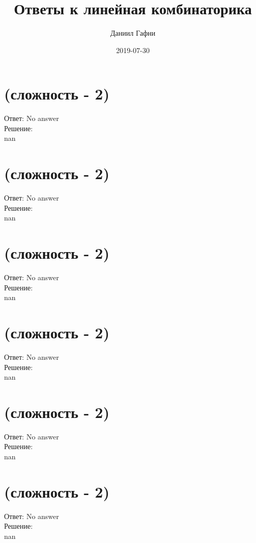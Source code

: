 \documentclass{article}%
\title{Ответы к линейная комбинаторика}%
\author{Даниил Гафни}%
\date{2019{-}07{-}30}%
\begin{document}
%
\normalsize%
\maketitle%
\section{(сложность {-} 2)}%
\label{sec:( {-} 2)}%
\hspace{3ex} Ответ: No answer \\%
%
\hspace*{3ex} Решение: \\%
nan

%
\section{(сложность {-} 2)}%
\label{sec:( {-} 2)}%
\hspace{3ex} Ответ: No answer \\%
%
\hspace*{3ex} Решение: \\%
nan

%
\section{(сложность {-} 2)}%
\label{sec:( {-} 2)}%
\hspace{3ex} Ответ: No answer \\%
%
\hspace*{3ex} Решение: \\%
nan

%
\section{(сложность {-} 2)}%
\label{sec:( {-} 2)}%
\hspace{3ex} Ответ: No answer \\%
%
\hspace*{3ex} Решение: \\%
nan

%
\section{(сложность {-} 2)}%
\label{sec:( {-} 2)}%
\hspace{3ex} Ответ: No answer \\%
%
\hspace*{3ex} Решение: \\%
nan

%
\section{(сложность {-} 2)}%
\label{sec:( {-} 2)}%
\hspace{3ex} Ответ: No answer \\%
%
\hspace*{3ex} Решение: \\%
nan
\end{document}
